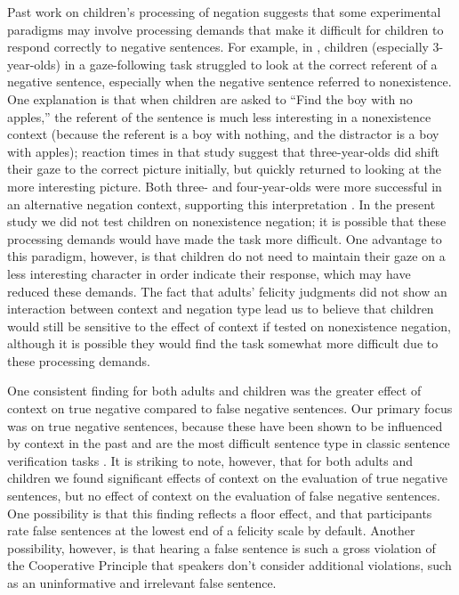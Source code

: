 \documentclass[man, noapacite]{apa2}
\begin{document}
Past work on children's processing of negation suggests that some experimental paradigms may involve processing demands that make it difficult for children to respond correctly to negative sentences. For example, in , children (especially 3-year-olds) in a gaze-following task struggled to look at the correct referent of a negative sentence, especially when the negative sentence referred to nonexistence. One explanation is that when children are asked to ``Find the boy with no apples,'' the referent of the sentence is much less interesting in a nonexistence context (because the referent is a boy with nothing, and the distractor is a boy with apples); reaction times in that study suggest that three-year-olds did shift their gaze to the correct picture initially, but quickly returned to looking at the more interesting picture. Both three- and four-year-olds  were more successful in an alternative negation context, supporting this interpretation \cite{nordmeyer2014b}. In the present study we did not test children on nonexistence negation; it is possible that these processing demands would have made the task more difficult. One advantage to this paradigm, however, is that children do not need to maintain their gaze on a less interesting character in order indicate their response, which may have reduced these demands. The fact that adults' felicity judgments did not show an interaction between context and negation type lead us to believe that children would still be sensitive to the effect of context if tested on nonexistence negation, although it is possible they would find the task somewhat more difficult due to these processing demands.

One consistent finding for both adults and children was the greater effect of context on true negative compared to false negative sentences. Our primary focus was on true negative sentences, because these have been shown to be influenced by context in the past \cite{wason1965, glenberg1999, nordmeyer2014b} and are the most difficult sentence type in classic sentence verification tasks \cite{hclark1972}. It is striking to note, however, that for both adults and children we found significant effects of context on the evaluation of true negative sentences, but no effect of context on the evaluation of false negative sentences. One possibility is that this finding reflects a floor effect, and that participants rate false sentences at the lowest end of a felicity scale by default. Another possibility, however, is that hearing a false sentence is such a gross violation of the Cooperative Principle that speakers don't consider additional violations, such as an uninformative and irrelevant false sentence.
\end{document}
